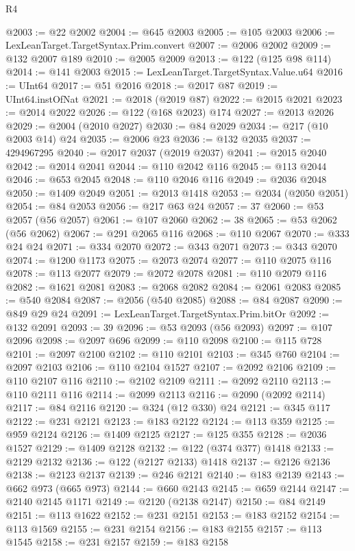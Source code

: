 \begin{lexlean}{R4}
\begin{coremodule}
@2003 := @22 @2002
@2004 := @645 @2003
@2005 := @105 @2003
@2006 := LexLeanTarget.TargetSyntax.Prim.convert
@2007 := @2006 @2002
@2009 := @132 @2007 @189
@2010 := @2005 @2009
@2013 := @122 (@125 @98 @114)
@2014 := @141 @2003
@2015 := LexLeanTarget.TargetSyntax.Value.u64
@2016 := UInt64
@2017 := @51 @2016
@2018 := @2017 @87
@2019 := UInt64.instOfNat
@2021 := @2018 (@2019 @87)
@2022 := @2015 @2021
@2023 := @2014 @2022
@2026 := @122 (@168 @2023) @174
@2027 := @2013 @2026
@2029 := @2004 (@2010 @2027)
@2030 := @84 @2029
@2034 := @217 (@10 @2003 @14) @24
@2035 := @2006 @23
@2036 := @132 @2035
@2037 := 4294967295
@2040 := @2017 @2037 (@2019 @2037)
@2041 := @2015 @2040
@2042 := @2014 @2041
@2044 := @110 @2042 @116
@2045 := @113 @2044
@2046 := @653 @2045
@2048 := @110 @2046 @116
@2049 := @2036 @2048
@2050 := @1409 @2049
@2051 := @2013 @1418
@2053 := @2034 (@2050 @2051)
@2054 := @84 @2053
@2056 := @217 @63 @24
@2057 := 37
@2060 := @53 @2057 (@56 @2057)
@2061 := @107 @2060
@2062 := 38
@2065 := @53 @2062 (@56 @2062)
@2067 := @291 @2065 @116
@2068 := @110 @2067
@2070 := @333 @24 @24
@2071 := @334 @2070
@2072 := @343 @2071
@2073 := @343 @2070
@2074 := @1200 @1173
@2075 := @2073 @2074
@2077 := @110 @2075 @116
@2078 := @113 @2077
@2079 := @2072 @2078
@2081 := @110 @2079 @116
@2082 := @1621 @2081
@2083 := @2068 @2082
@2084 := @2061 @2083
@2085 := @540 @2084
@2087 := @2056 (@540 @2085)
@2088 := @84 @2087
@2090 := @849 @29 @24
@2091 := LexLeanTarget.TargetSyntax.Prim.bitOr
@2092 := @132 @2091
@2093 := 39
@2096 := @53 @2093 (@56 @2093)
@2097 := @107 @2096
@2098 := @2097 @696
@2099 := @110 @2098
@2100 := @115 @728
@2101 := @2097 @2100
@2102 := @110 @2101
@2103 := @345 @760
@2104 := @2097 @2103
@2106 := @110 @2104 @1527
@2107 := @2092 @2106
@2109 := @110 @2107 @116
@2110 := @2102 @2109
@2111 := @2092 @2110
@2113 := @110 @2111 @116
@2114 := @2099 @2113
@2116 := @2090 (@2092 @2114)
@2117 := @84 @2116
@2120 := @324 (@12 @330) @24
@2121 := @345 @117
@2122 := @231 @2121
@2123 := @183 @2122
@2124 := @113 @359
@2125 := @959 @2124
@2126 := @1409 @2125
@2127 := @125 @355
@2128 := @2036 @1527
@2129 := @1409 @2128
@2132 := @122 (@374 @377) @1418
@2133 := @2129 @2132
@2136 := @122 (@2127 @2133) @1418
@2137 := @2126 @2136
@2138 := @2123 @2137
@2139 := @246 @2121
@2140 := @183 @2139
@2143 := @662 @973 (@665 @973)
@2144 := @660 @2143
@2145 := @659 @2144
@2147 := @2140 @2145 @1171
@2149 := @2120 (@2138 @2147)
@2150 := @84 @2149
@2151 := @113 @1622
@2152 := @231 @2151
@2153 := @183 @2152
@2154 := @113 @1569
@2155 := @231 @2154
@2156 := @183 @2155
@2157 := @113 @1545
@2158 := @231 @2157
@2159 := @183 @2158

\end{coremodule}
\end{lexlean}
